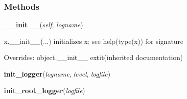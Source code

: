   \subsubsection{Methods}

    \vspace{0.5ex}

\hspace{.8\funcindent}\begin{boxedminipage}{\funcwidth}

    \raggedright \textbf{\_\_init\_\_}(\textit{self}, \textit{logname})

\setlength{\parskip}{2ex}
    x.\_\_init\_\_(...) initializes x; see help(type(x)) for signature

\setlength{\parskip}{1ex}
      Overrides: object.\_\_init\_\_ 	extit{(inherited documentation)}

    \end{boxedminipage}

    \label{etude:utils:mylogging:LoggedClass:init_logger}

    \vspace{0.5ex}

\hspace{.8\funcindent}\begin{boxedminipage}{\funcwidth}

    \raggedright \textbf{init\_logger}(\textit{logname}, \textit{level}, \textit{logfile})

\setlength{\parskip}{2ex}
\setlength{\parskip}{1ex}
    \end{boxedminipage}

    \label{etude:utils:mylogging:LoggedClass:init_root_logger}

    \vspace{0.5ex}

\hspace{.8\funcindent}\begin{boxedminipage}{\funcwidth}

    \raggedright \textbf{init\_root\_logger}(\textit{logfile})

\setlength{\parskip}{2ex}
\setlength{\parskip}{1ex}
    \end{boxedminipage}

